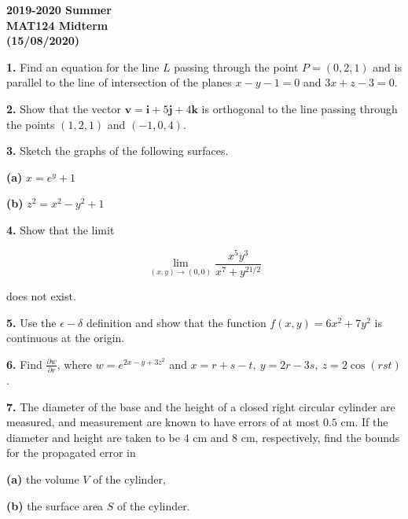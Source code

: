 \documentclass{article}
\begin{document}
\pagestyle{empty}
\large

\begin{center}
\textbf{2019-2020 Summer \\MAT124 Midterm\\(15/08/2020)}
\end{center}

\textbf{1.} Find an equation for the line $L$ passing through the point $P=(0,2,1)$ and is parallel to the line of intersection of the planes $x-y-1=0$ and $3x+z-3=0$.

\vspace{1em}

\textbf{2.} Show that the vector $\mathbf{v}=\mathbf{i}+5\mathbf{j}+4\mathbf{k}$ is orthogonal to the line passing through the points $(1,2,1)$ and $(-1,0,4)$.

\vspace{1em}

\textbf{3.} Sketch the graphs of the following surfaces.

\textbf{(a)} $x={e}^y+1$

\textbf{(b)} $z^2=x^2-y^2+1$

\vspace{1em}

\textbf{4.} Show that the limit

\[\lim_{(x,y)\to(0,0)}\frac{x^5y^3}{x^7+y^{21/2}}\]

does not exist.

\vspace{1em}

\textbf{5.} Use the $\epsilon-\delta$ definition and show that the function $f(x,y)=6x^2+7y^2$ is continuous at the origin.

\vspace{1em}

\textbf{6.} Find $\displaystyle\frac{\partial w}{\partial r}$, where $w={e}^{2x-y+3z^2}$ and $x=r+s-t,\:y=2r-3s,\:z=2\cos(rst)$.

\vspace{1em}

\textbf{7.} The diameter of the base and the height of a closed right circular cylinder are measured, and measurement are known to have errors of at most $0.5$ cm. If the diameter and height are taken to be $4$ cm and $8$ cm, respectively, find the bounds for the propagated error in

\textbf{(a)} the volume $V$ of the cylinder,

\textbf{(b)} the surface area $S$ of the cylinder.
\end{document}
